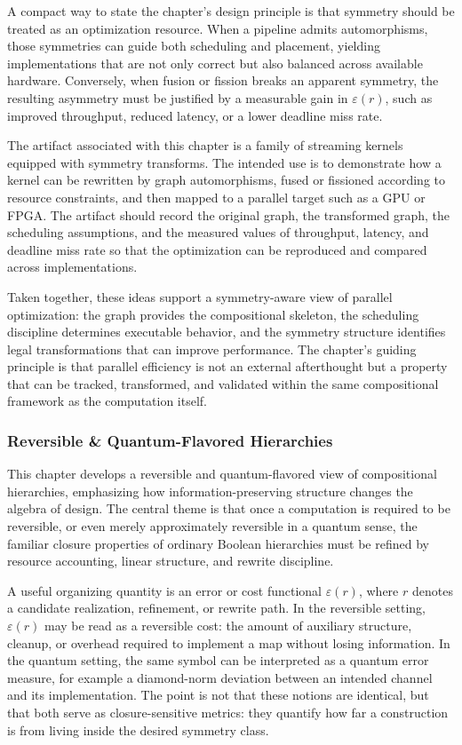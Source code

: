 \documentclass[11pt]{article}
\begin{document}
A compact way to state the chapter's design principle is that symmetry should be treated as an optimization resource. When a pipeline admits automorphisms, those symmetries can guide both scheduling and placement, yielding implementations that are not only correct but also balanced across available hardware. Conversely, when fusion or fission breaks an apparent symmetry, the resulting asymmetry must be justified by a measurable gain in \(\varepsilon(r)\), such as improved throughput, reduced latency, or a lower deadline miss rate.

The artifact associated with this chapter is a family of streaming kernels equipped with symmetry transforms. The intended use is to demonstrate how a kernel can be rewritten by graph automorphisms, fused or fissioned according to resource constraints, and then mapped to a parallel target such as a GPU or FPGA. The artifact should record the original graph, the transformed graph, the scheduling assumptions, and the measured values of throughput, latency, and deadline miss rate so that the optimization can be reproduced and compared across implementations.

Taken together, these ideas support a symmetry-aware view of parallel optimization: the graph provides the compositional skeleton, the scheduling discipline determines executable behavior, and the symmetry structure identifies legal transformations that can improve performance. The chapter's guiding principle is that parallel efficiency is not an external afterthought but a property that can be tracked, transformed, and validated within the same compositional framework as the computation itself.


\subsubsection{Reversible \& Quantum-Flavored Hierarchies}

This chapter develops a reversible and quantum-flavored view of compositional hierarchies, emphasizing how information-preserving structure changes the algebra of design. The central theme is that once a computation is required to be reversible, or even merely approximately reversible in a quantum sense, the familiar closure properties of ordinary Boolean hierarchies must be refined by resource accounting, linear structure, and rewrite discipline.

A useful organizing quantity is an error or cost functional \(\varepsilon(r)\), where \(r\) denotes a candidate realization, refinement, or rewrite path. In the reversible setting, \(\varepsilon(r)\) may be read as a reversible cost: the amount of auxiliary structure, cleanup, or overhead required to implement a map without losing information. In the quantum setting, the same symbol can be interpreted as a quantum error measure, for example a diamond-norm deviation between an intended channel and its implementation. The point is not that these notions are identical, but that both serve as closure-sensitive metrics: they quantify how far a construction is from living inside the desired symmetry class.
\end{document}
